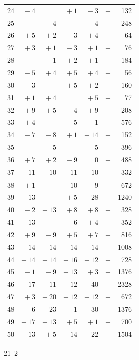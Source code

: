 \documentclass[11pt]{article}
\begin{document}
\begin{center}
\begin{tabular}{rrrrrrr}
24 & $-\ 4$ &       & $+\ 1$ & $-\ 3$ & $+$ & 132 \\
25 &       & $-\ 4$ &       & $-\ 4$ & $-$ & 248 \\
26 & $+\ 5$ & $+\ 2$ & $-\ 3$ & $+\ 4$ & $+$ & 64 \\
27 & $+\ 3$ & $+\ 1$ & $-\ 3$ & $+\ 1$ & $-$ & 76 \\
28 &       & $-\ 1$ & $+\ 2$ & $+\ 1$ & $+$ & 184 \\
29 & $-\ 5$ & $+\ 4$ & $+\ 5$ & $+\ 4$ & $+$ & 56 \\
30 & $-\ 3$ &       & $+\ 5$ & $+\ 2$ & $-$ & 160 \\
31 & $+\ 1$ & $+\ 4$ &       & $+\ 5$ & $+$ & 77 \\
32 & $+\ 9$ & $+\ 5$ & $-\ 4$ & $+\ 9$ & $+$ & 208 \\
33 & $+\ 4$ &       & $-\ 5$ & $-\ 1$ & $+$ & 576 \\
34 & $-\ 7$ & $-\ 8$ & $+\ 1$ & $-\ 14$ & $-$ & 152 \\
35 &       & $-\ 5$ &       & $-\ 5$ & $-$ & 396 \\
36 & $+\ 7$ & $+\ 2$ & $-\ 9$ & $0$ & $-$ & 488 \\
37 & $+\ 11$ & $+\ 10$ & $-\ 11$ & $+\ 10$ & $+$ & 332 \\
38 & $+\ 1$ &       & $-\ 10$ & $-\ 9$ & $-$ & 672 \\
39 & $-\ 13$ &       & $+\ 5$ & $-\ 28$ & $+$ & 1240 \\
40 & $-\ 2$ & $+\ 13$ & $+\ 8$ & $+\ 8$ & $+$ & 328 \\
41 & $+\ 13$ &       & $-\ 6$ & $+\ 4$ & $+$ & 352 \\
42 & $+\ 9$ & $-\ 9$ & $+\ 5$ & $+\ 7$ & $+$ & 816 \\
43 & $-\ 14$ & $-\ 14$ & $+\ 14$ & $-\ 14$ & $-$ & 1008 \\
44 & $-\ 14$ & $-\ 14$ & $+\ 16$ & $-\ 12$ & $-$ & 728 \\
45 & $-\ 1$ & $-\ 9$ & $+\ 13$ & $+\ 3$ & $+$ & 1376 \\
46 & $+\ 17$ & $+\ 11$ & $+\ 12$ & $+\ 40$ & $-$ & 2328 \\
47 & $+\ 3$ & $-\ 20$ & $-\ 12$ & $-\ 12$ & $-$ & 672 \\
48 & $-\ 6$ & $-\ 23$ & $-\ 1$ & $-\ 30$ & $+$ & 1376 \\
49 & $-\ 17$ & $+\ 13$ & $+\ 5$ & $+\ 1$ & $-$ & 700 \\
50 & $-\ 13$ & $+\ 5$ & $-\ 14$ & $-\ 22$ & $-$ & 1504 \\
\hline
\end{tabular}
\end{center}
\hfill 21--2
\end{document}
